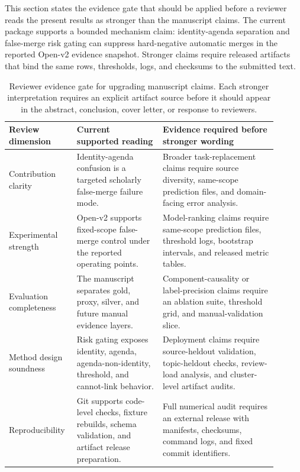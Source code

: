 \documentclass[11pt]{article}
\begin{document}
This section states the evidence gate that should be applied before a reviewer reads the present results as stronger than the manuscript claims. The current package supports a bounded mechanism claim: identity-agenda separation and false-merge risk gating can suppress hard-negative automatic merges in the reported Open-v2 evidence snapshot. Stronger claims require released artifacts that bind the same rows, thresholds, logs, and checksums to the submitted text.

\begin{table}[H]
\caption{Reviewer evidence gate for upgrading manuscript claims. Each stronger interpretation requires an explicit artifact source before it should appear in the abstract, conclusion, cover letter, or response to reviewers.}
\label{tab:reviewer-evidence-gate}
\centering
\footnotesize
\setlength{\tabcolsep}{2pt}
\begin{tabular}{L{0.20\linewidth}L{0.30\linewidth}L{0.40\linewidth}}
\toprule
Review dimension & Current supported reading & Evidence required before stronger wording \\
\midrule
Contribution clarity & Identity-agenda confusion is a targeted scholarly false-merge failure mode. & Broader task-replacement claims require source diversity, same-scope prediction files, and domain-facing error analysis. \\
Experimental strength & Open-v2 supports fixed-scope false-merge control under the reported operating points. & Model-ranking claims require same-scope prediction files, threshold logs, bootstrap intervals, and released metric tables. \\
Evaluation completeness & The manuscript separates gold, proxy, silver, and future manual evidence layers. & Component-causality or label-precision claims require an ablation suite, threshold grid, and manual-validation slice. \\
Method design soundness & Risk gating exposes identity, agenda, agenda-non-identity, threshold, and cannot-link behavior. & Deployment claims require source-heldout validation, topic-heldout checks, review-load analysis, and cluster-level artifact audits. \\
Reproducibility & Git supports code-level checks, fixture rebuilds, schema validation, and artifact release preparation. & Full numerical audit requires an external release with manifests, checksums, command logs, and fixed commit identifiers. \\
\bottomrule
\end{tabular}
\end{table}
\end{document}
